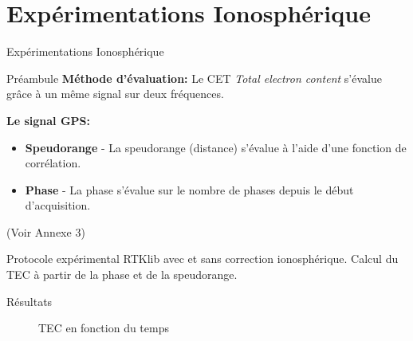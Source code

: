 \documentclass[xcolor=dvipsnames,envcountsect]{beamer}
\begin{document}
\section{Expérimentations Ionosphérique}
\begin{frame}
	\centering
	\begin{block}
		\scshape
		\begin{center}
			\Huge Expérimentations Ionosphérique
		\end{center}
	\end{block}
\end{frame}
\begin{frame}{Préambule}
        \textbf{Méthode d'évaluation:} 
		Le CET \textit{Total electron content} s'évalue grâce à un même signal sur deux fréquences.

        \textbf{Le signal GPS:} 
	    \begin{itemize}
            \item \textbf{Speudorange} - La speudorange (distance) s'évalue à l'aide d'une fonction de corrélation.
            \item \textbf{Phase} - La phase s'évalue sur le nombre de phases depuis le début d'acquisition.
        \end{itemize}
		\begin{flushright}
			\tiny{(Voir Annexe 3)}
		\end{flushright}
\end{frame}

\begin{frame}{Protocole expérimental}
	RTKlib avec et sans correction ionosphérique.
	Calcul du TEC à partir de la phase et de la speudorange.
\end{frame}

\begin{frame}{Résultats}
	\begin{figure}
		\centering
		\caption {TEC en fonction du temps}	
	\end{figure}
\end{frame}
\end{document}
